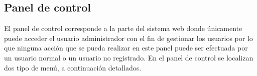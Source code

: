 \documentclass[12pt,a4paper, twoside]{report}
\begin{document}

	\subsection{Panel de control}
	
	El panel de control corresponde a la parte del sistema web donde únicamente puede acceder el usuario administrador con el fin de gestionar los usuarios por lo que ninguna acción que se pueda realizar en este panel puede ser efectuada por un usuario normal o un usuario no registrado. En el panel de control se localizan dos tipo de menú, a continuación detallados.
	
\end{document}
